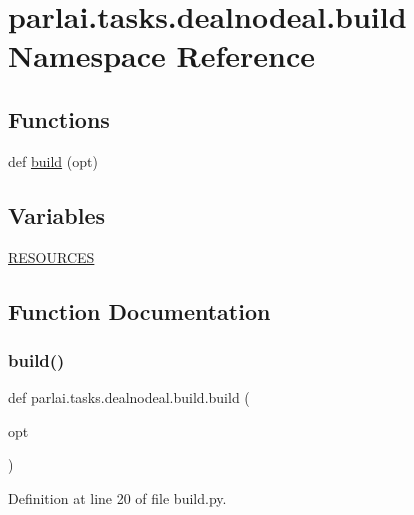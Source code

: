 \hypertarget{namespaceparlai_1_1tasks_1_1dealnodeal_1_1build}{}\section{parlai.\+tasks.\+dealnodeal.\+build Namespace Reference}
\label{namespaceparlai_1_1tasks_1_1dealnodeal_1_1build}
\subsection*{Functions}
\begin{DoxyCompactItemize}
\item 
def \hyperlink{namespaceparlai_1_1tasks_1_1dealnodeal_1_1build_a964c2b43bf49102b9541d584d10d8632}{build} (opt)
\end{DoxyCompactItemize}
\subsection*{Variables}
\begin{DoxyCompactItemize}
\item 
\hyperlink{namespaceparlai_1_1tasks_1_1dealnodeal_1_1build_ace9d70121fa551d0c322b96a03a29fcb}{R\+E\+S\+O\+U\+R\+C\+ES}
\end{DoxyCompactItemize}


\subsection{Function Documentation}
\mbox{\label{namespaceparlai_1_1tasks_1_1dealnodeal_1_1build_a964c2b43bf49102b9541d584d10d8632}} 
\subsubsection{\texorpdfstring{build()}{build()}}
{\footnotesize\ttfamily def parlai.\+tasks.\+dealnodeal.\+build.\+build (\begin{DoxyParamCaption}\item[{}]{opt }\end{DoxyParamCaption})}



Definition at line 20 of file build.\+py.


